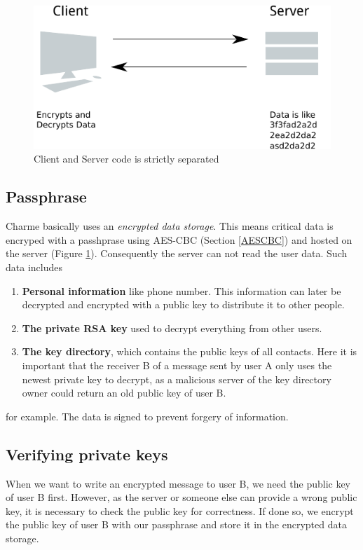 \documentclass{scrartcl}
\begin{document}
\begin{figure}[ht]
	\centering
  \includegraphics[]{eds.pdf}
	\caption{Client and Server code is strictly separated}
	\label{fig1}
\end{figure}


\subsection{Passphrase}
Charme basically uses an \textit{encrypted data storage}. This means critical data is encryped with a passhprase using AES-CBC (Section \ref{AESCBC}) and hosted on the server  (Figure \ref{fig1}). Consequently the server can not read the user data. Such data includes
\begin{enumerate}
\item \textbf{Personal information} like phone number. This information can later be decrypted and encrypted with a public key to distribute it to other people.
\item \textbf{The private RSA key} used to decrypt everything from other users.
\item \textbf{ The key directory}, which contains the public keys of all contacts. Here it is important that the receiver B of a message sent by user A only uses the newest private key to decrypt, as a malicious server of the key directory owner could return an old public key of user B.
\end{enumerate}
for example. The data is signed to prevent forgery of information.

 \subsection{Verifying private keys}
 When we want to write an encrypted message to user B, we need the public key of user B first. However, as the server or someone else can provide a wrong public key, it is necessary to check the public key for correctness. If done so, we encrypt the public key of user B with our passphrase and store it in the encrypted data storage.
 
\end{document}

